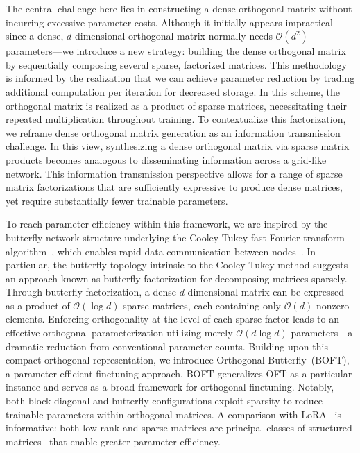 The central challenge here lies in constructing a dense orthogonal matrix without incurring excessive parameter costs. Although it initially appears impractical—since a dense, $d$-dimensional orthogonal matrix normally needs $\mathcal{O}(d^2)$ parameters—we introduce a new strategy: building the dense orthogonal matrix by sequentially composing several sparse, factorized matrices. This methodology is informed by the realization that we can achieve parameter reduction by trading additional computation per iteration for decreased storage. In this scheme, the orthogonal matrix is realized as a product of sparse matrices, necessitating their repeated multiplication throughout training. To contextualize this factorization, we reframe dense orthogonal matrix generation as an information transmission challenge. In this view, synthesizing a dense orthogonal matrix via sparse matrix products becomes analogous to disseminating information across a grid-like network. This information transmission perspective allows for a range of sparse matrix factorizations that are sufficiently expressive to produce dense matrices, yet require substantially fewer trainable parameters.

To reach parameter efficiency within this framework, we are inspired by the butterfly network structure underlying the Cooley-Tukey fast Fourier transform algorithm~\cite{cooley1965algorithm}, which enables rapid data communication between nodes~\cite{klasing1994broadcasting}. In particular, the butterfly topology intrinsic to the Cooley-Tukey method suggests an approach known as butterfly factorization for decomposing matrices sparsely. Through butterfly factorization, a dense $d$-dimensional matrix can be expressed as a product of $\mathcal{O}(\log d)$ sparse matrices, each containing only $\mathcal{O}(d)$ nonzero elements. Enforcing orthogonality at the level of each sparse factor leads to an effective orthogonal parameterization utilizing merely $\mathcal{O}(d\log d)$ parameters—a dramatic reduction from conventional parameter counts. Building upon this compact orthogonal representation, we introduce Orthogonal Butterfly~(BOFT), a parameter-efficient finetuning approach. BOFT generalizes OFT as a particular instance and serves as a broad framework for orthogonal finetuning. Notably, both block-diagonal and butterfly configurations exploit sparsity to reduce trainable parameters within orthogonal matrices. A comparison with LoRA~\cite{hulora2022} is informative: both low-rank and sparse matrices are principal classes of structured matrices~\cite{candes2011robust} that enable greater parameter efficiency.

